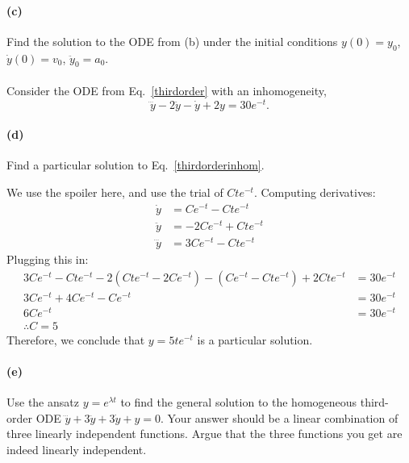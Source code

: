 \documentclass{article}
\begin{document}
\paragraph{(c)}		\extrapart
Find the solution to the ODE from (b) under the initial conditions $y(0) = y_{0}$, $\dot{y}(0) = v_{0}$, $\ddot{y}_{0} = a_{0}$.

\phline
\paragraph{}
Consider the ODE from Eq.~\ref{thirdorder} with an inhomogeneity,
	\begin{equation}
		\dddot{y} - 2\ddot{y} - \dot{y} + 2y= 30e^{-t}.
	\label{thirdorderinhom}
	\end{equation}
	
\paragraph{(d)}
Find a particular solution to Eq.~\ref{thirdorderinhom}.

\begin{solution}
	We use the spoiler here, and use the trial of $Cte^{-t}$. Computing derivatives:
	\begin{align*}
		\dot y &= Ce^{-t} - Cte^{-t}\\
		\ddot y &= -2Ce^{-t} + Cte^{-t} \\
		\dddot y &= 3Ce^{-t} - Cte^{-t}
	\end{align*}
	Plugging this in:
	\begin{align*}
		3Ce^{-t} - Cte^{-t} - 2\left( Cte^{-t} - 2Ce^{-t} \right) - \left( Ce^{-t} - Cte^{-t} \right) + 
		2Cte^{-t} &= 30 e^{-t}\\
		3Ce^{-t} + 4Ce^{-t} - Ce^{-t} &=  30e^{-t} \\
		6Ce^{-t} &= 30e^{-t} \\
		\therefore C = 5
	\end{align*}
	Therefore, we conclude that $y = 5te^{-t}$ is a particular solution.
\end{solution}

\phline
\paragraph{(e)}		\extrapart
Use the ansatz $y = e^{\lambda t}$ to find the general solution to the homogeneous third-order ODE $\dddot{y} + 3\ddot{y} + 3\dot{y} + y = 0$.  Your answer should be a linear
combination of three linearly independent functions.  Argue that the three functions you get are indeed linearly independent.
\end{document}
